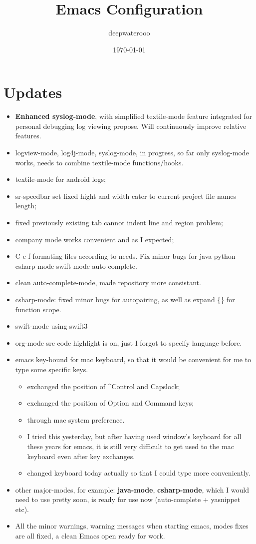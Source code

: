 \documentclass[9pt, b5paper]{article}
\author{deepwaterooo}
\date{\today}
\title{Emacs Configuration}
\begin{document}
\maketitle
\tableofcontents


\section{Updates}
\label{sec-1}
\begin{itemize}
\item \textbf{Enhanced syslog-mode}, with simplified textile-mode feature integrated for personal debugging log viewing propose. Will continuously improve relative features.
\item logview-mode, log4j-mode, syslog-mode, in progress, so far only syslog-mode works, needs to combine textile-mode functions/hooks.
\item textile-mode for android logs;
\item sr-speedbar set fixed hight and width cater to current project file names length;
\item fixed previously existing tab cannot indent line and region problem;
\item company mode works convenient and as I expected;
\item C-c f formating files according to needs. Fix minor bugs for java python csharp-mode swift-mode auto complete.
\item clean auto-complete-mode, made repository more consistant.
\item csharp-mode: fixed minor bugs for autopairing, as well as expand \{\} for function scope.
\item swift-mode using swift3
\item org-mode src code highlight is on, just I forgot to specify language before.
\item emacs key-bound for mac keyboard, so that it would be convenient for me to type some specific keys. 
\begin{itemize}
\item exchanged the position of \^{}Control and Capslock;
\item exchanged the position of Option and Command keys;
\item through mac system preference.
\item I tried this yesterday, but after having used window's keyboard for all these years for emacs, it is still very difficult to get used to the mac keyboard even after key exchanges.
\item changed keyboard today actually so that I could type more conveniently.
\end{itemize}
\item other major-modes, for example: \textbf{java-mode}, \textbf{csharp-mode}, which I would need to use pretty soon, is ready for use now (auto-complete + yasnippet etc).
\item All the minor warnings, warning messages when starting emacs, modes fixes are all fixed, a clean Emacs open ready for work.
\end{itemize}
\end{document}
